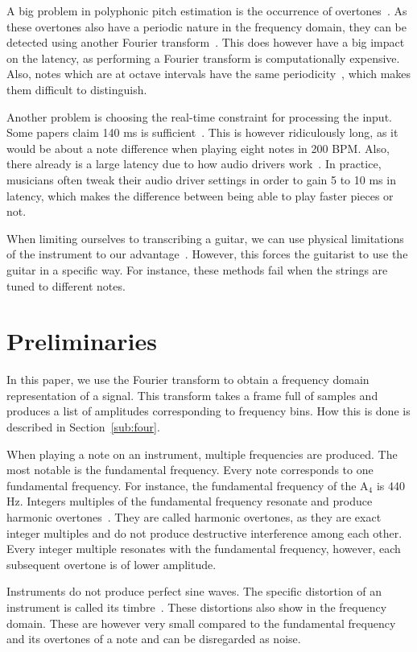 \documentclass[10pt,twocolumn]{article}
\begin{document}
A big problem in polyphonic pitch estimation is the occurrence of overtones~\cite{oud}. As these overtones also have a periodic nature in the frequency domain, they can be detected using another Fourier transform~\cite{double}. This does however have a big impact on the latency, as performing a Fourier transform is computationally expensive. Also, notes which are at octave intervals have the same periodicity~\cite{octave}, which makes them difficult to distinguish.

Another problem is choosing the real-time constraint for processing the input. Some papers claim 140 ms is sufficient~\cite{sloomboi}. This is however ridiculously long, as it would be about a note difference when playing eight notes in 200 BPM. Also, there already is a large latency due to how audio drivers work~\cite{os}. In practice, musicians often tweak their audio driver settings in order to gain 5 to 10 ms in latency, which makes the difference between being able to play faster pieces or not.

When limiting ourselves to transcribing a guitar, we can use physical limitations of the instrument to our advantage~\cite{physical}. However, this forces the guitarist to use the guitar in a specific way. For instance, these methods fail when the strings are tuned to different notes.


\section{Preliminaries}
In this paper, we use the Fourier transform to obtain a frequency domain representation of a signal. This transform takes a frame full of samples and produces a list of amplitudes corresponding to frequency bins. How this is done is described in Section~\ref{sub:four}.

When playing a note on an instrument, multiple frequencies are produced. The most notable is the fundamental frequency. Every note corresponds to one fundamental frequency. For instance, the fundamental frequency of the $\text{A}_4$ is 440 Hz. Integers multiples of the fundamental frequency resonate and produce harmonic overtones~\cite{overtones}. They are called harmonic overtones, as they are exact integer multiples and do not produce destructive interference among each other. Every integer multiple resonates with the fundamental frequency, however, each subsequent overtone is of lower amplitude.

Instruments do not produce perfect sine waves. The specific distortion of an instrument is called its timbre~\cite{timbre}. These distortions also show in the frequency domain. These are however very small compared to the fundamental frequency and its overtones of a note and can be disregarded as noise.
\end{document}
